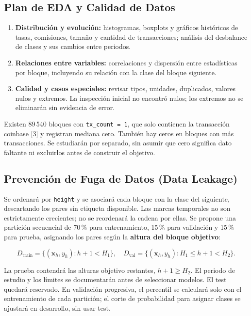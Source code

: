 \documentclass[11pt,a4paper]{article}
\begin{document}
\subsection{Plan de EDA y Calidad de Datos}

\begin{enumerate}

\item \textbf{Distribución y evolución:} histogramas, boxplots y gráficos históricos de tasas, comisiones, tamaño y cantidad de transacciones; análisis del desbalance de clases y sus cambios entre periodos.

\item \textbf{Relaciones entre variables:} correlaciones y dispersión entre estadísticas por bloque, incluyendo su relación con la clase del bloque siguiente.

\item \textbf{Calidad y casos especiales:} revisar tipos, unidades, duplicados, valores nulos y extremos. La inspección inicial no encontró nulos; los extremos no se eliminarán sin evidencia de error.
\end{enumerate}

Existen 89\,540 bloques con \texttt{tx\_count = 1}, que solo contienen la transacción coinbase [3] y registran mediana cero. También hay ceros en bloques con más transacciones. Se estudiarán por separado, sin asumir que cero significa dato faltante ni excluirlos antes de construir el objetivo.

\newpage

\subsection{Prevención de Fuga de Datos (Data Leakage)}

Se ordenará por \texttt{height} y se asociará cada bloque con la clase del siguiente, descartando los pares sin etiqueta disponible. Las marcas temporales no son estrictamente crecientes; no se reordenará la cadena por ellas. Se propone una partición secuencial de 70\,\% para entrenamiento, 15\,\% para validación y 15\,\% para prueba, asignando los pares según la \textbf{altura del bloque objetivo}:

\begin{equation}
D_{\mathrm{train}}=\{(\mathbf{x}_h,y_h):h+1<H_1\},\quad
D_{\mathrm{val}}=\{(\mathbf{x}_h,y_h):H_1\leq h+1<H_2\}.
\end{equation}

La prueba contendrá las alturas objetivo restantes, $h+1\geq H_2$. El periodo de estudio y los límites se documentarán antes de seleccionar modelos. El test quedará reservado. En validación progresiva, el percentil se calculará solo con el entrenamiento de cada partición; el corte de probabilidad para asignar clases se ajustará en desarrollo, sin usar test.
\end{document}
